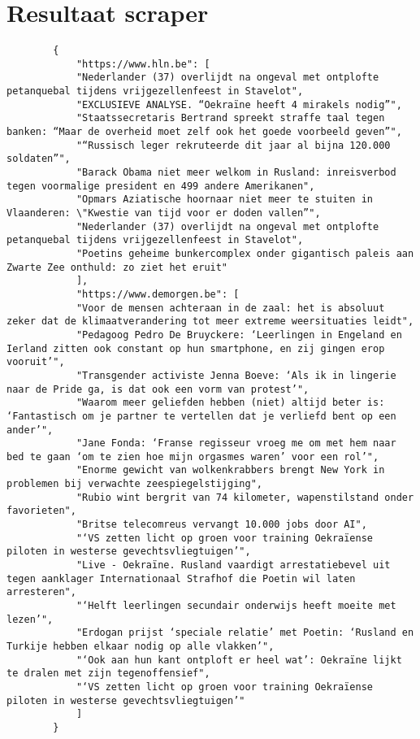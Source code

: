\section{Resultaat scraper}
\begin{listing}
    \begin{verbatim}
        {
            "https://www.hln.be": [
            "Nederlander (37) overlijdt na ongeval met ontplofte petanquebal tijdens vrijgezellenfeest in Stavelot",
            "EXCLUSIEVE ANALYSE. “Oekraïne heeft 4 mirakels nodig”",
            "Staatssecretaris Bertrand spreekt straffe taal tegen banken: “Maar de overheid moet zelf ook het goede voorbeeld geven”",
            "“Russisch leger rekruteerde dit jaar al bijna 120.000 soldaten”",
            "Barack Obama niet meer welkom in Rusland: inreisverbod tegen voormalige president en 499 andere Amerikanen",
            "Opmars Aziatische hoornaar niet meer te stuiten in Vlaanderen: \"Kwestie van tijd voor er doden vallen”",
            "Nederlander (37) overlijdt na ongeval met ontplofte petanquebal tijdens vrijgezellenfeest in Stavelot",
            "Poetins geheime bunkercomplex onder gigantisch paleis aan Zwarte Zee onthuld: zo ziet het eruit"
            ],
            "https://www.demorgen.be": [
            "Voor de mensen achteraan in de zaal: het is absoluut zeker dat de klimaatverandering tot meer extreme weersituaties leidt",
            "Pedagoog Pedro De Bruyckere: ‘Leerlingen in Engeland en Ierland zitten ook constant op hun smartphone, en zij gingen erop vooruit’",
            "Transgender activiste Jenna Boeve: ‘Als ik in lingerie naar de Pride ga, is dat ook een vorm van protest’",
            "Waarom meer geliefden hebben (niet) altijd beter is: ‘Fantastisch om je partner te vertellen dat je verliefd bent op een ander’",
            "Jane Fonda: ‘Franse regisseur vroeg me om met hem naar bed te gaan ‘om te zien hoe mijn orgasmes waren’ voor een rol’",
            "Enorme gewicht van wolkenkrabbers brengt New York in problemen bij verwachte zeespiegelstijging",
            "Rubio wint bergrit van 74 kilometer, wapenstilstand onder favorieten",
            "Britse telecomreus vervangt 10.000 jobs door AI",
            "‘VS zetten licht op groen voor training Oekraïense piloten in westerse gevechtsvliegtuigen’",
            "Live - Oekraïne. Rusland vaardigt arrestatiebevel uit tegen aanklager Internationaal Strafhof die Poetin wil laten arresteren",
            "‘Helft leerlingen secundair onderwijs heeft moeite met lezen’",
            "Erdogan prijst ‘speciale relatie’ met Poetin: ‘Rusland en Turkije hebben elkaar nodig op alle vlakken’",
            "‘Ook aan hun kant ontploft er heel wat’: Oekraïne lijkt te dralen met zijn tegenoffensief",
            "‘VS zetten licht op groen voor training Oekraïense piloten in westerse gevechtsvliegtuigen’"
            ]
        }
        
    \end{verbatim}
    \label{bijlage:json-input}
\end{listing}
\pagebreak


